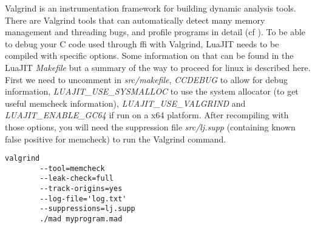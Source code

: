 
Valgrind is an instrumentation framework for building dynamic analysis tools.
There are Valgrind tools that can automatically detect many memory management
and threading bugs, and profile programs in detail (cf \cite{valgrind}). To be
able to debug your C code used through ffi with Valgrind, LuaJIT needs to be
compiled with specific options. Some information on that can be found in the
LuaJIT \emph{Makefile} but a summary of the way to proceed for linux is described
here. First we need to uncomment in \emph{src/makefile}, \emph{CCDEBUG} to
allow for debug information, \emph{LUAJIT\_USE\_SYSMALLOC} to use the system
allocator (to get useful memcheck information), \emph{LUAJIT\_USE\_VALGRIND}
and \emph{LUAJIT\_ENABLE\_GC64} if run on a x64 platform. After recompiling
with those options, you will need the suppression file \emph{src/lj.supp}
(containing known false positive for memcheck) to run the Valgrind command.

\begin{lstlisting}[style=CStyle]
valgrind
		--tool=memcheck
		--leak-check=full
		--track-origins=yes
		--log-file='log.txt'
		--suppressions=lj.supp
		./mad myprogram.mad
\end{lstlisting}


